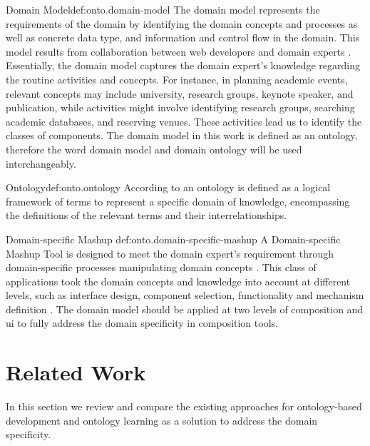 \begin{thesisdefinition}{Domain Model}{def:onto.domain-model}
The \gls{domain model} represents the requirements of the domain by identifying the domain concepts and processes as well as concrete data type, and information and control flow in the domain. This model results from collaboration between web developers and domain experts \autocite{Chemnitz2017}. Essentially, the \gls{domain model} captures the domain expert’s knowledge regarding the routine activities and concepts. For instance, in planning academic events, relevant concepts may include university, research groups, keynote speaker, and publication, while activities might involve identifying research groups, searching academic databases, and reserving venues. These activities lead us to identify the classes of components. The \gls{domain model} in this work is defined as an ontology, therefore the word \gls{domain model} and domain ontology will be used interchangeably.
\end{thesisdefinition}

\begin{thesisdefinition}{Ontology}{def:onto.ontology}
According to \autocite{Chemnitz2017} an \gls{ontology} is defined as a logical framework of terms to represent a specific domain of knowledge, encompassing the definitions of the relevant terms and their interrelationships.
\end{thesisdefinition}

\begin{thesisdefinition}{Domain-specific Mashup }{def:onto.domain-specific-mashup }
A \gls{Domain-specific Mashup Tool} is designed to meet the domain expert’s requirement  through domain-specific processes manipulating domain concepts \autocite{Casati2012}. This class of applications took the domain concepts and knowledge into account at different levels, such as interface design, component selection, functionality and mechanism definition \autocite{Gulliksen1995}. The \gls{domain model} should be applied at two levels of composition and \gls{ui} to fully address the domain specificity in composition tools. 
\end{thesisdefinition}

\vspace{-10pt}
\hypertarget{sec:onto.related-work}{%
\section{Related Work}\label{sec:onto.related-work}}
\vspace{10pt}
In this section we review and compare the existing approaches for ontology-based development and \gls{ontology} learning as a solution to address the domain specificity.

